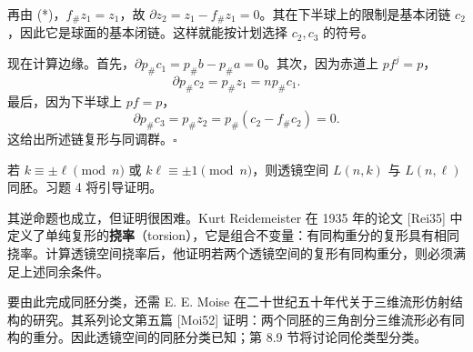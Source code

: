 再由 (*)，$f_\#z_1=z_1$，故 $\partial z_2=z_1-f_\#z_1=0$。其在下半球上的限制是基本闭链 $c_2$，因此它是球面的基本闭链。这样就能按计划选择 $c_2,c_3$ 的符号。

现在计算边缘。首先，$\partial p_\#c_1=p_\#b-p_\#a=0$。其次，因为赤道上 $pf^j=p$，
\[
\partial p_\#c_2=p_\#z_1=np_\#c_1.
\]
最后，因为下半球上 $pf=p$，
\[
\partial p_\#c_3=p_\#z_2=p_\#(c_2-f_\#c_2)=0.
\]
这给出所述链复形与同调群。\hfill$\square$

若 $k\equiv\pm\ell\pmod n$ 或 $k\ell\equiv\pm1\pmod n$，则透镜空间 $L(n,k)$ 与 $L(n,\ell)$ 同胚。习题 4 将引导证明。

其逆命题也成立，但证明很困难。Kurt Reidemeister 在 1935 年的论文 [Rei35] 中定义了单纯复形的\textbf{挠率}（torsion），它是组合不变量：有同构重分的复形具有相同挠率。计算透镜空间挠率后，他证明若两个透镜空间的复形有同构重分，则必须满足上述同余条件。

要由此完成同胚分类，还需 E. E. Moise 在二十世纪五十年代关于三维流形仿射结构的研究。其系列论文第五篇 [Moi52] 证明：两个同胚的三角剖分三维流形必有同构的重分。因此透镜空间的同胚分类已知；第 8.9 节将讨论同伦类型分类。

